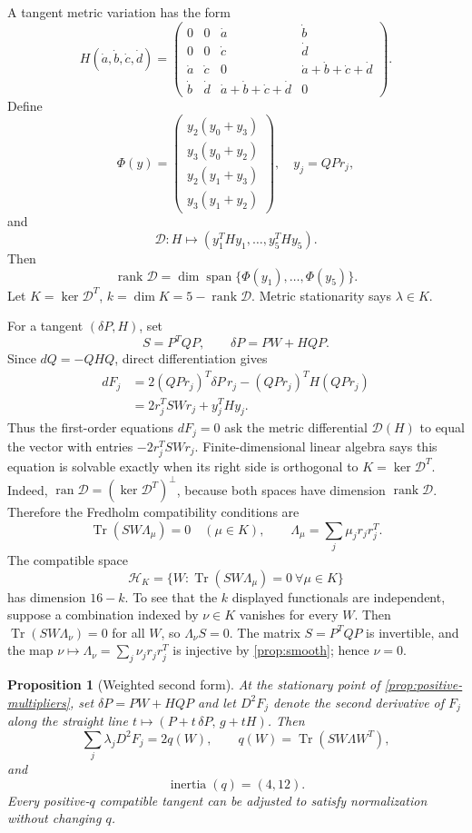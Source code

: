 \documentclass[11pt]{article}
\newtheorem{proposition}[theorem]{Proposition}
\theoremstyle{definition}
\newcommand{\Tr}{\operatorname{Tr}}
\newcommand{\rank}{\operatorname{rank}}
\newcommand{\cD}{\mathcal D}
\begin{document}
A tangent metric variation has the form
\[
H(\dot a,\dot b,\dot c,\dot d)=
\begin{pmatrix}
0&0&\dot a&\dot b\\
0&0&\dot c&\dot d\\
\dot a&\dot c&0&\dot a+\dot b+\dot c+\dot d\\
\dot b&\dot d&\dot a+\dot b+\dot c+\dot d&0
\end{pmatrix}.
\]
Define
\[
\Phi(y)=
\begin{pmatrix}
y_2(y_0+y_3)\\
y_3(y_0+y_2)\\
y_2(y_1+y_3)\\
y_3(y_1+y_2)
\end{pmatrix},
\quad y_j=QPr_j,
\]
and
\[
\cD:H\longmapsto(y_1^THy_1,\ldots,y_5^THy_5).
\]
Then
\[
\rank\cD=\dim\operatorname{span}\{\Phi(y_1),\ldots,\Phi(y_5)\}.
\]
Let \(K=\ker\cD^T\), \(k=\dim K=5-\rank\cD\). Metric stationarity says
\(\lambda\in K\).

For a tangent \((\delta P,H)\), set
\[
S=P^TQP,\qquad \delta P=PW+HQ P.
\]
Since \(dQ=-QHQ\), direct differentiation gives
\[
\begin{aligned}
dF_j
&=2(QPr_j)^T\delta P\,r_j-(QPr_j)^TH(QPr_j)\\
&=2r_j^TSWr_j+y_j^THy_j.
\end{aligned}
\]
Thus the first-order equations \(dF_j=0\) ask the metric differential
\(\cD(H)\) to equal the vector with entries \(-2r_j^TSWr_j\).
Finite-dimensional linear algebra says this equation is solvable exactly
when its right side is orthogonal to \(K=\ker\cD^T\). Indeed,
\(\operatorname{ran}\cD=(\ker\cD^T)^\perp\), because both spaces have
dimension \(\rank\cD\). Therefore the Fredholm compatibility conditions are
\[
\Tr(SW\Lambda_\mu)=0\quad(\mu\in K),
\qquad
\Lambda_\mu=\sum_j\mu_jr_jr_j^T.
\]
The compatible space
\[
\mathcal H_K=
\{W:\Tr(SW\Lambda_\mu)=0\ \forall\mu\in K\}
\]
has dimension \(16-k\). To see that the \(k\) displayed functionals are
independent, suppose a combination indexed by \(\nu\in K\) vanishes for every
\(W\). Then \(\Tr(SW\Lambda_\nu)=0\) for all \(W\), so
\(\Lambda_\nu S=0\). The matrix \(S=P^TQP\) is invertible, and the map
\(\nu\mapsto\Lambda_\nu=\sum_j\nu_jr_jr_j^T\) is injective by
\cref{prop:smooth}; hence \(\nu=0\).

\begin{proposition}[Weighted second form]
\label{prop:second-form}
At the stationary point of \cref{prop:positive-multipliers}, set
\(\delta P=PW+HQP\) and let \(D^2F_j\) denote the second derivative of
\(F_j\) along the straight line \(t\mapsto(P+t\,\delta P,\,g+tH)\). Then
\[
\sum_j\lambda_jD^2F_j=2q(W),\qquad
q(W)=\Tr(SW\Lambda W^T),
\]
and
\[
\operatorname{inertia}(q)=(4,12).
\]
Every positive-\(q\) compatible tangent can be adjusted to satisfy
normalization without changing \(q\).
\end{proposition}
\end{document}
